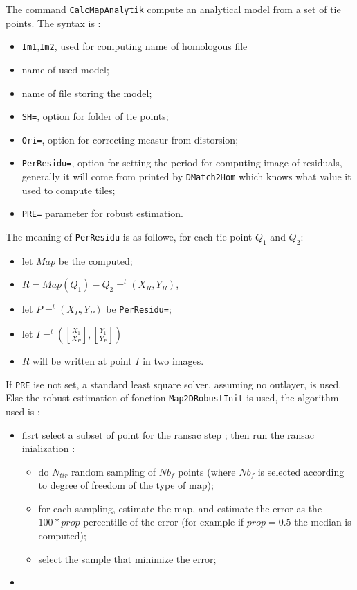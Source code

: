 The command {\tt CalcMapAnalytik} compute an analytical model from a set
of tie points.  The syntax is :

\begin{itemize}
   \item {\tt Im1},{\tt Im2}, used for computing name of homologous file
   \item name of used model;
   \item name of file storing the model;
   \item {\tt SH=}, option for folder of tie points;
   \item {\tt Ori=}, option for correcting measur from distorsion;
   \item {\tt PerResidu=}, option for setting the period for computing image of residuals, generally
         it will come from printed by {\tt DMatch2Hom} which knows what value it used to compute tiles;
   \item  {\tt PRE=} parameter for robust estimation.
\end{itemize}

The meaning of {\tt PerResidu} is as followe, for each tie point $Q_1$ and $Q_2$:

\begin{itemize}
   \item let $Map$ be the computed;
   \item $R=Map(Q_1)-Q_2=  ^t (X_R,Y_R)$,
   \item let $P=  ^t (X_P,Y_P)$ be {\tt PerResidu=}; 
   \item let $I= ^t ([\frac{X_1}{X_P}],[\frac{Y_1}{Y_P}])$
   \item $R$ will be written at point $I$ in two images.
\end{itemize}


If  {\tt PRE} ise not set, a standard least square solver, assuming no outlayer, is used.
Else the robust estimation of fonction {\tt Map2DRobustInit} is used,
the algorithm used is :

\begin{itemize}
   \item fisrt select a subset of point for the ransac step ;
         then run the ransac inialization :
         \begin{itemize}
             \item  do $N_{tir}$ random sampling of $Nb_f$ points (where $Nb_f$ is
                    selected according to degree of freedom of the type of map);

             \item  for each sampling, estimate the map, and  estimate the error
                    as the $100*prop$ percentille of the error (for example if $prop=0.5$
                    the median is computed);
                    
             \item  select the sample that minimize the error;
         \end{itemize}
   \item 
\end{itemize}




